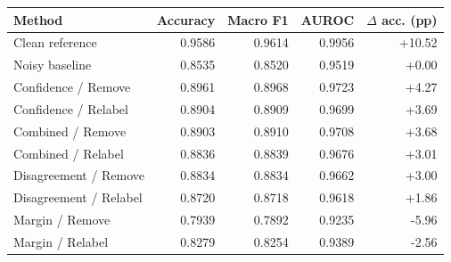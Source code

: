 \begin{tabular}{lrrrr}
\toprule
Method & Accuracy & Macro F1 & AUROC & $\Delta$ acc. (pp) \\
\midrule
Clean reference & 0.9586 & 0.9614 & 0.9956 & +10.52 \\
Noisy baseline & 0.8535 & 0.8520 & 0.9519 & +0.00 \\
Confidence / Remove & 0.8961 & 0.8968 & 0.9723 & +4.27 \\
Confidence / Relabel & 0.8904 & 0.8909 & 0.9699 & +3.69 \\
Combined / Remove & 0.8903 & 0.8910 & 0.9708 & +3.68 \\
Combined / Relabel & 0.8836 & 0.8839 & 0.9676 & +3.01 \\
Disagreement / Remove & 0.8834 & 0.8834 & 0.9662 & +3.00 \\
Disagreement / Relabel & 0.8720 & 0.8718 & 0.9618 & +1.86 \\
Margin / Remove & 0.7939 & 0.7892 & 0.9235 & -5.96 \\
Margin / Relabel & 0.8279 & 0.8254 & 0.9389 & -2.56 \\
\bottomrule
\end{tabular}
